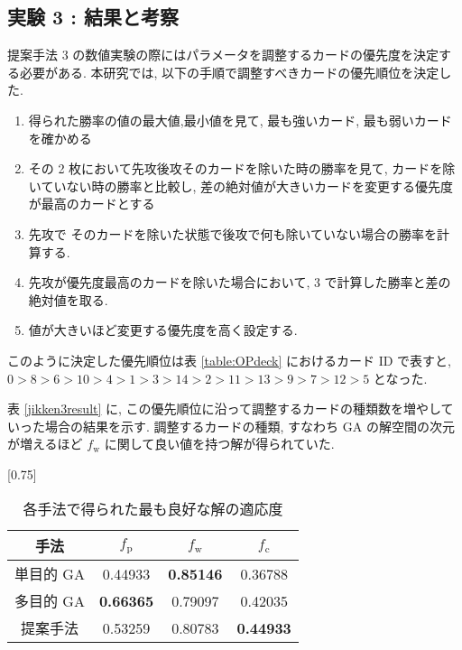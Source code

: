 \documentclass[twocolumn]{jarticle}     %
\begin{document}
               \subsection{実験 3 : 結果と考察}
               提案手法 3 の数値実験の際にはパラメータを調整するカードの優先度を決定する必要がある.
               本研究では, 以下の手順で調整すべきカードの優先順位を決定した. 
               \begin{enumerate}
                  \small
                  \setlength{\itemsep}{0cm} %
                 \item 得られた勝率の値の最大値,最小値を見て, 最も強いカード, 最も弱いカードを確かめる
                 \item その 2 枚において先攻後攻そのカードを除いた時の勝率を見て, カードを除いていない時の勝率と比較し, 差の絶対値が大きいカードを変更する優先度が最高のカードとする
                 \item 先攻で そのカードを除いた状態で後攻で何も除いていない場合の勝率を計算する.
                 \item 先攻が優先度最高のカードを除いた場合において, 3 で計算した勝率と差の絶対値を取る. 
                 \item 値が大きいほど変更する優先度を高く設定する.
               \end{enumerate}
               このように決定した優先順位は表 \ref{table:OPdeck} におけるカード ID で表すと, 
               $0 > 8 > 6 > 10 > 4 > 1 > 3 > 14 > 2 > 11 > 13 > 9 > 7 > 12 > 5$ となった. \par
               表 \ref{jikken3result} に, この優先順位に沿って調整するカードの種類数を増やしていった場合の結果を示す.
               調整するカードの種類, すなわち GA の解空間の次元が増えるほど $f_\mathrm{w}$ に関して良い値を持つ解が得られていた. 
                 \begin{table}[t]
                  \centering
                  \caption{各手法で得られた最も良好な解の適応度}
                  \label{res_3}
                  \vspace{-0.3cm}
                  
                  \scalebox{0.75}[0.75]{
                    \begin{tabular}{|c|c|c|c|}
                      \hline
                      手法        & $f_\mathrm{p}$ & $f_\mathrm{w}$ & $f_\mathrm{c}$ \\ \hline \hline
                      単目的 GA      & 0.44933         & \textbf{0.85146}   & 0.36788          \\ \hline
                      多目的 GA  & \textbf{0.66365}         & 0.79097   & 0.42035          \\ \hline
                      提案手法   & 0.53259              &  0.80783     & \textbf{0.44933}  \\ \hline
                      \end{tabular}
                  }
                  \vspace{-0.3cm}
                  \end{table}
\end{document}
